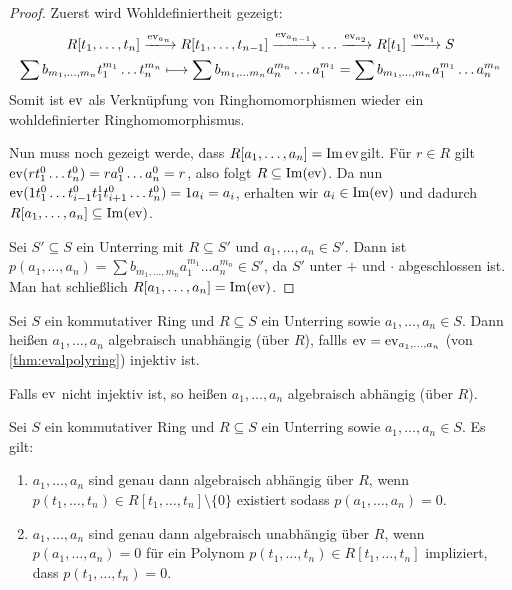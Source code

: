 \documentclass[12pt,a4paper]{scrartcl}
\begin{document}
\begin{proof}
		Zuerst wird Wohldefiniertheit gezeigt:
		\begin{equation*}
		\begin{gathered}
			R[t_1,\dots, t_n]\xlongrightarrow{\ev_{a_n}} R[t_1,\dots, t_{n-1}]\xlongrightarrow{\ev_{a_{n-1}}}\dots \xlongrightarrow{\ev_{a_2}}R[t_1]\xlongrightarrow{\ev_{a_1}} S \\
			\sum b_{m_1,\dots, m_n}t_1^{m_1}\dots t_n^{m_n}\longmapsto \sum b_{m_1,\dots m_n} a_n^{m_n}\dots a_1^{m_1} = \sum b_{m_1,\dots, m_n}a_1^{m_1}\dots a_n^{m_n}
		\end{gathered}
		\end{equation*}
		Somit ist $\operatorname{ev}$ als Verknüpfung von Ringhomomorphismen wieder ein wohldefinierter Ringhomomorphismus.
		
		Nun muss noch gezeigt werde, dass $R\lbrack a_1,\dots,a_n\rbrack = \operatorname{Im} \operatorname{ev}$gilt. Für $r\in R$ gilt $\operatorname{ev}(rt_1^0\dots t_n^0) = ra_1^0\dots a_n^0 = r$, also folgt $R\subseteq \operatorname{Im} (\operatorname{ev})$.
		Da nun $\operatorname{ev}(1t_1^0\dots t_{i-1}^0t_1^1t_{i+1}^0\dots t_n^0) = 1a_i = a_i$, erhalten wir $a_i\in\operatorname{Im} (\operatorname{ev})$ und dadurch $R[a_1,\dots, a_n]\subseteq \operatorname{Im}(\operatorname{ev})$.
		
		Sei $S'\subseteq S$ ein Unterring mit $R\subseteq S'$ und $a_1,\dots, a_n\in S'$. Dann ist $p(a_1,\dots,a_n) = \sum b_{m_1,\dots,m_n}a_1^{m_1}\dots a_n^{m_n}\in S'$, da $S'$ unter $+$ und $\cdot$ abgeschlossen ist. Man hat schließlich $R[a_1,\dots,a_n] = \operatorname{Im} (\operatorname{ev})$.
\end{proof}

\begin{defi}
	Sei $S$ ein kommutativer Ring und $R\subseteq S$ ein Unterring sowie $a_1,\dots, a_n\in S$. Dann heißen $a_1,\dots,a_n$ algebraisch unabhängig (über $R$), fallls $\operatorname{ev} = \operatorname{ev}_{a_1,\dots, a_n}$ (von \cref{thm:evalpolyring}) injektiv ist.
	
	Falls $\operatorname{ev}$ nicht injektiv ist, so heißen $a_1,\dots, a_n$ algebraisch abhängig (über $R$).
\end{defi}

\begin{lem}
	Sei $S$ ein kommutativer Ring und $R\subseteq S$ ein Unterring sowie $a_1,\dots, a_n\in S$. Es gilt:
	\begin{enumerate}
		\item $a_1,\dots,a_n$ sind genau dann algebraisch abhängig über $R$, wenn $p(t_1,\dots,t_n)\in R[t_1,\dots,t_n]\setminus\{0\}$ existiert sodass $p(a_1,\dots,a_n) = 0$.
		\item $a_1,\dots, a_n$ sind genau dann algebraisch unabhängig über $R$, wenn $p(a_1,\dots,a_n) = 0$ für ein Polynom $p(t_1,\dots, t_n)\in R[t_1,\dots,t_n]$ impliziert, dass $p(t_1,\dots, t_n) = 0$.
	\end{enumerate}
\end{lem}
\end{document}
